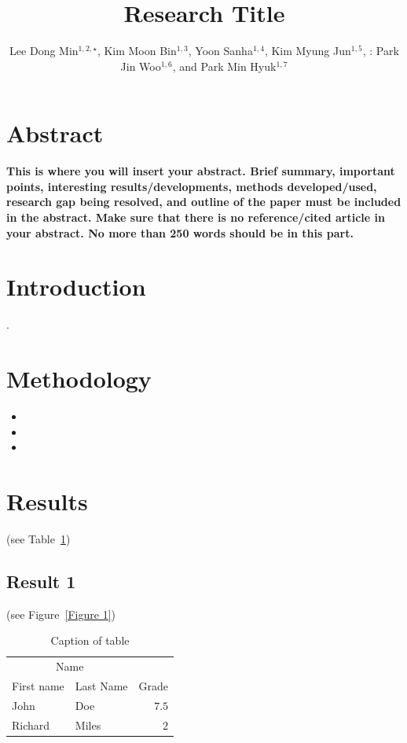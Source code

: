 \documentclass[	DIV=calc,%
							paper=a4,%
							fontsize=12pt,%
							twocolumn]{scrartcl}	 					%
\title{Research Title}					%
\author{Lee Dong Min$^{1, 2,\star}$, Kim Moon Bin$^{1,3}$, Yoon Sanha$^{1,4}$, \newline Kim Myung Jun$^{1,5}$, : Park Jin Woo$^{1,6}$, and Park Min Hyuk$^{1,7}$ }											%
\date{}																%
\newcommand{\initial}[1]{%
     \lettrine[lines=3,lhang=0.3,nindent=0em]{
     				\color{DarkBlue}
     				{\textsf{#1}}}{}}
\begin{document}
\maketitle
\thispagestyle{fancy} 			%
\section*{Abstract}
\initial{\textbf{T}}\textbf{his is where you will insert your abstract. Brief summary, important points, interesting results/developments, methods developed/used, research gap being resolved, and outline of the paper must be included in the abstract. Make sure that there is no reference/cited article in your abstract. No more than 250 words should be in this part.}

\section*{Introduction}
\; \; %
\lipsum[20] \citep{Ref1}. %

\lipsum[5]

\lipsum[5]

\section*{Methodology}
\; \; %
\lipsum[6]
\begin{itemize}
	\item \lipsum[7] 
	\item \lipsum[7] 
	\item \lipsum[7] 
\end{itemize}

\lipsum[6]

\section*{Results}
\; \; %
\lipsum[7] (see Table~\ref{Tab1}) 

\subsection*{Result 1}
\; \; %
\lipsum[7] (see Figure~\ref{Figure 1})

\begin{table}
\caption{Caption of table}
\centering
	\begin{tabular}{llr}
		\toprule
		\multicolumn{2}{c}{Name} \\
		\cmidrule(r){1-2}
			First name & Last Name & Grade \\
		\midrule
			John & Doe & $7.5$ \\
			Richard & Miles & $2$ \\
		\bottomrule
	\end{tabular}
 \label{Tab1}
\end{table}
\end{document}
